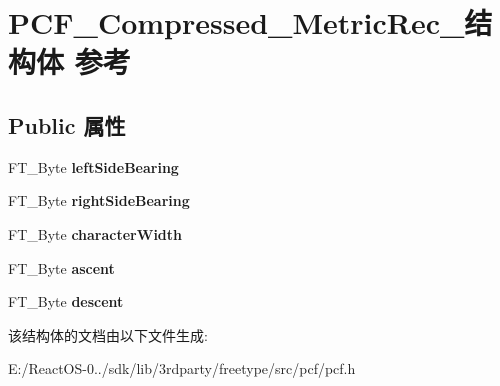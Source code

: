 \hypertarget{struct_p_c_f___compressed___metric_rec__}{}\section{P\+C\+F\+\_\+\+Compressed\+\_\+\+Metric\+Rec\+\_\+结构体 参考}
\label{struct_p_c_f___compressed___metric_rec__}
\subsection*{Public 属性}
\begin{DoxyCompactItemize}
\item 
\mbox{\label{struct_p_c_f___compressed___metric_rec___aa755334ae0a81cf54129fc19af69024e}} 
F\+T\+\_\+\+Byte {\bfseries left\+Side\+Bearing}
\item 
\mbox{\label{struct_p_c_f___compressed___metric_rec___aab4b6fa2533bdb15cb3f44d028eb5ebc}} 
F\+T\+\_\+\+Byte {\bfseries right\+Side\+Bearing}
\item 
\mbox{\label{struct_p_c_f___compressed___metric_rec___a0dedaf11ea8c350f2ecb4e258d9e6769}} 
F\+T\+\_\+\+Byte {\bfseries character\+Width}
\item 
\mbox{\label{struct_p_c_f___compressed___metric_rec___a5bbb3b83ebf608c0e503f4409bf2354b}} 
F\+T\+\_\+\+Byte {\bfseries ascent}
\item 
\mbox{\label{struct_p_c_f___compressed___metric_rec___aaa1d108831def803c4d4dd93f3035512}} 
F\+T\+\_\+\+Byte {\bfseries descent}
\end{DoxyCompactItemize}


该结构体的文档由以下文件生成\+:\begin{DoxyCompactItemize}
\item 
E\+:/\+React\+O\+S-\/0../sdk/lib/3rdparty/freetype/src/pcf/pcf.\+h\end{DoxyCompactItemize}
